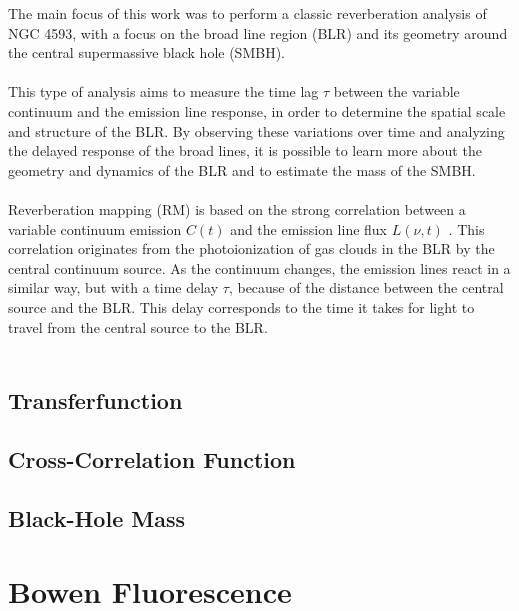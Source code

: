 The main focus of this work was to perform a classic reverberation analysis of NGC 4593, with a focus on the broad line region (BLR) and its geometry around the central supermassive black hole (SMBH).\\\\
This type of analysis aims to measure the time lag $\tau$ between the variable continuum and the emission line response, in order to determine the spatial scale and structure of the BLR. By observing these variations over time and analyzing the delayed response of the broad lines, it is possible to learn more about the geometry and dynamics of the BLR and to estimate the mass of the SMBH.\\\\
Reverberation mapping (RM) is based on the strong correlation between a variable continuum emission $C(t)$ and the emission line flux $L(\nu, t)$ \parencite{horne2021space}. This correlation originates from the photoionization of gas clouds in the BLR by the central continuum source. As the continuum changes, the emission lines react in a similar way, but with a time delay $\tau$, because of the distance between the central source and the BLR. This delay corresponds to the time it takes for light to travel from the central source to the BLR.\\\\

\subsection{Transferfunction}

\subsection{Cross-Correlation Function}

\subsection{Black-Hole Mass}

\section{Bowen Fluorescence}
